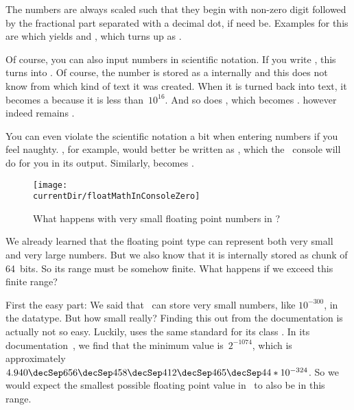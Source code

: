 The numbers are always scaled such that they begin with non-zero digit followed by the fractional part separated with a decimal dot, if need be.
Examples for this are  which yields  and , which turns up as .

Of course, you can also input numbers in scientific notation.
If you write , this turns into .
Of course, the number is stored as a  internally and this  does not know from which kind of text it was created.
When it is turned back into text, it becomes a  because it is less than~$10^{16}$.
And so does , which becomes .
 however indeed remains .

You can even violate the scientific notation a bit when entering numbers if you feel naughty.
, for example, would better be written as , which the \python\ console will do for you in its output.
Similarly,  becomes .
\endhsection%
%
%
\label{sec:float:special}%
%
\begin{figure}%
\centering%
\texttt{[image: \\currentDir/floatMathInConsoleZero]}%
\caption{What happens with very small floating point numbers in \python?}%
\label{fig:floatMathInConsoleZero}%
\end{figure}%
%
We already learned that the floating point type  can represent both very small and very large numbers.
But we also know that it is internally stored as chunk of 64~bits.
So its range must be somehow finite.
What happens if we exceed this finite range?

First the easy part:
We said that \python\ can store very small numbers, like $10^{-300}$, in the  datatype.
But how small really?
Finding this out from the documentation is actually not so easy.
Luckily,  uses the same standard for its class .
In its documentation~\cite{O2024JPSEJDKV2AS:CD}, we find that the minimum value is~$2^{-1074}$, which is approximately~$4.940\decSep656\decSep458\decSep412\decSep465\decSep44*10^{-324}$.
So we would expect the smallest possible floating point value in \python\ to also be in this range.

